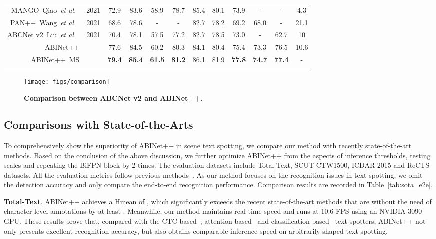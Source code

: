 \documentclass[10pt,journal,compsoc]{IEEEtran}
\def\etal{{\it et al.}\xspace}
\newlength\savedwidth
\newcommand\whline{\noalign{\global\savedwidth\arrayrulewidth
                           \global\arrayrulewidth 0.8pt}\hline
                  \noalign{\global\arrayrulewidth\savedwidth}}
\begin{document}
\begin{table*}[!t]
{\begin{tabular}{ r |c|cc|cc|cccc|c|c}
     MANGO~Qiao~\etal~\cite{qiao2021mango} & 2021& 72.9&83.6 &58.9&78.7 &85.4&80.1&73.9&- &- &4.3\\ PAN++~Wang~\etal~\cite{wang2021pan++} & 2021& 68.6&78.6 &-&- &82.7&78.2&69.2&68.0 &- &21.1 \\
     ABCNet v2~Liu~\etal~\cite{liu2020abcnetv2} & 2021 &70.4&78.1  &57.5&77.2 &82.7&78.5&73.0&-  &62.7 &10\\
     \hline
     ABINet++ & &77.6&84.5 &60.2&80.3 &84.1&80.4&75.4&73.3 &76.5 &10.6\\
     ABINet++~MS & &\bf{79.4}&\bf{85.4} &\bf{61.5}&\bf{81.2} &86.1&81.9&\bf{77.8}&\bf{74.7} &\bf{77.4} & -\\
     \whline
   \end{tabular}}
   \vspace{-2em}
 \end{table*}
 
 \begin{figure}
   \begin{center}
      \texttt{[image: figs/comparison]}
      \caption{\textbf{Comparison between ABCNet v2 and ABINet++.}}
      \label{fig:comparison}
   \end{center}
   \vspace{-1.5em}
 \end{figure}


\subsection{Comparisons with State-of-the-Arts}



To comprehensively show the superiority of ABINet++ in scene text spotting, we compare our method with recently state-of-the-art methods. Based on the conclusion of the above discussion, we further optimize ABINet++ from the aspects of inference thresholds, testing scales and repeating the BiFPN block by 2 times. The evaluation datasets include Total-Text, SCUT-CTW1500, ICDAR 2015 and ReCTS datasets. All the evaluation metrics follow previous methods~\cite{liu2020abcnetv2,wang2021pan++,liao2019mask}. As our method focuses on the recognition issues in text spotting, we omit the detection accuracy and only compare the end-to-end recognition performance. Comparison results are recorded in Table~\ref{tab:sota_e2e}.

\textbf{Total-Text}. ABINet++ achieves a Hmean of , which significantly exceeds the recent state-of-the-art methods that are without the need of character-level annotations by at least . Meanwhile, our method maintains real-time speed and runs at 10.6 FPS using an NVIDIA 3090 GPU. These results prove that, compared with the CTC-based~\cite{liu2020abcnet, wang2021pgnet}, attention-based~\cite{liu2020abcnetv2,wang2021pan++} and classification-based~\cite{qiao2021mango} text spotters, ABINet++ not only presents excellent recognition accuracy, but also obtains comparable inference speed on arbitrarily-shaped text spotting.
\end{document}
